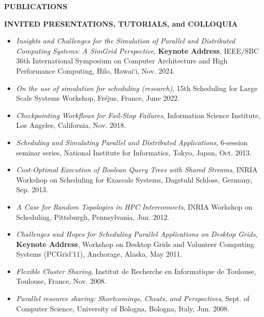 \documentclass[times,11pt]{letter}
\begin{document}
\noindent
{\large{\bf PUBLICATIONS}}



\noindent
{\large{\bf INVITED PRESENTATIONS, TUTORIALS, and COLLOQUIA}}

\begin{itemize}

\item [-] {\it Insights and Challenges for the Simulation of Parallel and Distributed Computing Systems: A SimGrid Perspective}, {\bf Keynote Address}, 
	IEEE/SBC 36th International Symposium on Computer Architecture and High Performance Computing, Hilo, Hawai`i, Nov. 2024.

\item [-] {\it On the use of simulation for scheduling (research)}, 
15th Scheduling for Large Scale Systems Workshop, Fr\'ejus, France, June 2022.

\item [-] {\it Checkpointing Workflows for Fail-Stop Failures}, 
Information Science Institute, Los Angeles, California, Nov. 2018.

\item [-] {\it Scheduling and Simulating Parallel and Distributed
Applications}, 6-session seminar series, National Institute for
Informatics, Tokyo, Japan, Oct. 2013.

\item [-] {\it Cost-Optimal Execution of Boolean Query Trees with Shared
Streams}, INRIA Workshop on Scheduling for Exascale Systems, Dagstuhl
Schloss, Germany, Sep. 2013.

\item [-] {\it A Case for Random Topologies in HPC Interconnects},
INRIA Workshop on Scheduling, Pittsburgh, Pennsylvania, 
Jun. 2012.

\item [-] {\it Challenges and Hopes for Scheduling Parallel Applications on Desktop Grids}, {\bf Keynote Address}, Workshop on Desktop Grids and Volunteer Computing Systems (PCGrid'11), Anchorage, Alaska, May 2011. 

\item [-] {\it Flexible Cluster Sharing}, Institut de Recherche
en Informatique de Toulouse, Toulouse, France, Nov. 2008. 

\item [-] {\it Parallel resource sharing: Shortcomings, Cheats, and
Perspectives}, Sept. of Computer Science, University of Bologna, Bologna,
Italy, Jun. 2008.



\end{itemize}
\end{document}
